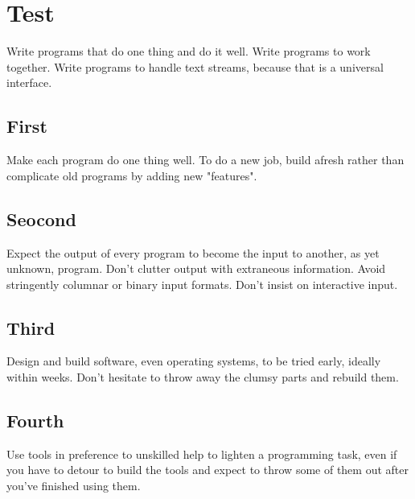 \section{\huge{Test}}
Write programs that do one thing and do it well. Write programs to work together. Write programs to handle text streams, because that is a universal interface.

\subsection{First}
Make each program do one thing well. To do a new job, build afresh rather than complicate old programs by adding new "features".

\subsection{Seocond}
Expect the output of every program to become the input to another, as yet unknown, program. Don't clutter output with extraneous information. Avoid stringently columnar or binary input formats. Don't insist on interactive input.

\subsection{Third}
Design and build software, even operating systems, to be tried early, ideally within weeks. Don't hesitate to throw away the clumsy parts and rebuild them.

\subsection{Fourth}
Use tools in preference to unskilled help to lighten a programming task, even if you have to detour to build the tools and expect to throw some of them out after you've finished using them.